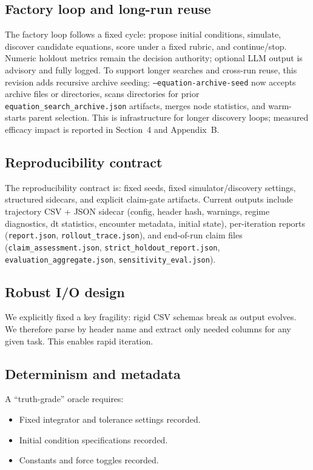 \documentclass[11pt]{article}
\begin{document}
\subsection{Factory loop and long-run reuse}
The factory loop follows a fixed cycle: propose initial conditions, simulate, discover candidate equations, score under a fixed rubric, and continue/stop. Numeric holdout metrics remain the decision authority; optional LLM output is advisory and fully logged.
To support longer searches and cross-run reuse, this revision adds recursive archive seeding: \texttt{--equation-archive-seed} now accepts archive files or directories, scans directories for prior \texttt{equation\_search\_archive.json} artifacts, merges node statistics, and warm-starts parent selection. This is infrastructure for longer discovery loops; measured efficacy impact is reported in Section~4 and Appendix~B.

\subsection{Reproducibility contract}
The reproducibility contract is: fixed seeds, fixed simulator/discovery settings, structured sidecars, and explicit claim-gate artifacts.
Current outputs include trajectory CSV + JSON sidecar (config, header hash, warnings, regime diagnostics, dt statistics, encounter metadata, initial state), per-iteration reports (\texttt{report.json}, \texttt{rollout\_trace.json}), and end-of-run claim files (\texttt{claim\_assessment.json}, \texttt{strict\_holdout\_report.json}, \texttt{evaluation\_aggregate.json}, \texttt{sensitivity\_eval.json}).

\subsection{Robust I/O design}
We explicitly fixed a key fragility: rigid CSV schemas break as output evolves. We therefore parse by header name and extract only needed columns for any given task. This enables rapid iteration.

\subsection{Determinism and metadata}
A ``truth-grade'' oracle requires:
\begin{itemize}
\item Fixed integrator and tolerance settings recorded.
\item Initial condition specifications recorded.
\item Constants and force toggles recorded.
\end{itemize}
\end{document}
